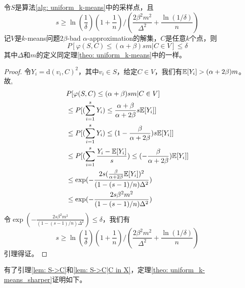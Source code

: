 \begin{lemma}
    \label{lem: S->C|C in X}
    令$S$是算法\ref{alg: uniform_k-means}中的采样点，且
    \begin{equation*}
    s \geq \ln(\frac{1}{\delta})(1+\frac{1}{n})/(\frac{2\beta^2 m^2}{\Delta^2}+\frac{\ln(1/\delta)}{n})
    \end{equation*}
    记$V$是$k$-means问题$2\beta$-bad $\alpha$-approximation的解集，$C$是任意$k$个点，则
    \begin{equation*}
    P[\varphi(S,C) \leq (\alpha+\beta)sm | C \in V] \leq \delta
    \end{equation*}
    其中$\Delta$和$m$的定义同定理\ref{theo: uniform_k-means}中的一样。
\end{lemma}
\begin{proof}
    令$Y_i = \text{d}(v_i,C)^2$，其中$v_i \in S$，给定$C \in V$，我们有$\mathbb{E}[Y_i] > (\alpha+2\beta)m$。故,
    \begin{align*}
    &P[\varphi(S,C) \leq (\alpha+\beta)sm | C \in V] \\
    &\leq P[(\sum_{i=1}^s Y_i) \leq \frac{\alpha+\beta}{\alpha+2\beta}s\mathbb{E}[Y_i]] \\
    &\leq P[(\sum_{i=1}^s Y_i) \leq (1-\frac{\beta}{\alpha+2\beta})s\mathbb{E}[Y_i]] \\
    &\leq P[(\sum_{i=1}^s \frac{Y_i - \mathbb{E}[Y_i]}{s}) \leq (-\frac{\beta}{\alpha+2\beta})\mathbb{E}[Y_i]] \\
    &\leq \exp(-\frac{2s(\frac{\beta}{\alpha+2\beta}\mathbb{E}[Y_i])^2}{(1-(s-1)/n)\Delta^2}) \\
    &\leq \exp(-\frac{2s\beta^2 m^2}{(1-(s-1)/n)\Delta^2})
    \end{align*}
    令$\exp(-\frac{2s\beta^2 m^2}{(1-(s-1)/n)\Delta^2}) \leq \delta$，我们有
    \begin{equation*}
    s \geq \ln(\frac{1}{\delta})(1+\frac{1}{n})/(\frac{2\beta^2 m^2}{\Delta^2}+\frac{\ln(1/\delta)}{n})
    \end{equation*}
    引理得证。
\end{proof}
有了引理\ref{lem: S->C}和\ref{lem: S->C|C in X}，定理\ref{theo: uniform_k-means_sharper}证明如下。
